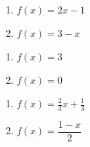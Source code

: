 \begin{multicols}{2}
\begin{enumerate}
\setcounter{enumi}{\value{HW}}

\item $f(x) = 2x - 1$ \label{graphlineexerfirst}
\item $f(x) = 3 - x$

\setcounter{HW}{\value{enumi}}
\end{enumerate}
\end{multicols}

\begin{multicols}{2}
\begin{enumerate}
\setcounter{enumi}{\value{HW}}

\item $f(x) = 3$
\item $f(x) = 0$

\setcounter{HW}{\value{enumi}}
\end{enumerate}
\end{multicols}

\begin{multicols}{2}
\begin{enumerate}
\setcounter{enumi}{\value{HW}}

\item $f(x) = \frac{2}{3} x + \frac{1}{3}$ 
\item $f(x) = \dfrac{1-x}{2}$ \label{graphlineexerlast}

\setcounter{HW}{\value{enumi}}
\end{enumerate}
\end{multicols}


